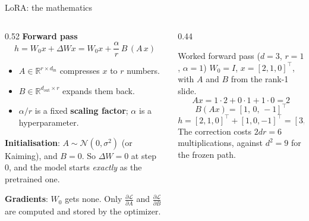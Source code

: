\documentclass[aspectratio=169,11pt]{beamer}
\begin{document}
\begin{frame}{LoRA: the mathematics}
  \begin{columns}[T]
    \begin{column}{0.52\textwidth}
      \small
      \textbf{Forward pass}
      \[
        h = W_0x + \Delta W x = W_0x + \frac{\alpha}{r}\,B\,(A\,x)
      \]
      \begin{itemize}
        \item $A\in\mathbb{R}^{r\times d_{\text{in}}}$ compresses $x$ to $r$ numbers.
        \item $B\in\mathbb{R}^{d_{\text{out}}\times r}$ expands them back.
        \item $\alpha/r$ is a fixed \textbf{scaling factor}; $\alpha$ is a hyperparameter.
      \end{itemize}
      \textbf{Initialisation}: $A\sim\mathcal{N}(0,\sigma^2)$ (or Kaiming), and $B=0$.
      So $\Delta W=0$ at step 0, and the model starts \emph{exactly} as the pretrained one.
      \vspace{1mm}

      \textbf{Gradients}: $W_0$ gets none. Only $\frac{\partial\mathcal{L}}{\partial A}$ and $\frac{\partial\mathcal{L}}{\partial B}$ are computed and stored by the optimizer.
    \end{column}
    \begin{column}{0.44\textwidth}
      \begin{exampleblock}{Worked forward pass ($d=3$, $r=1$, $\alpha=1$)}
        \small
        $W_0=I$, $x=[2,1,0]^\top$, with $A$ and $B$ from the rank-1 slide.
        \[
          Ax=1\cdot2+0\cdot1+1\cdot0=2
        \]
        \[
          B(Ax)=[1,\,0,\,-1]^\top
        \]
        \[
          h=[2,1,0]^\top+[1,0,-1]^\top=[3,1,-1]^\top
        \]
        The correction costs $2dr=6$ multiplications, against $d^2=9$ for the frozen path.
      \end{exampleblock}
    \end{column}
  \end{columns}
\end{frame}
\end{document}
